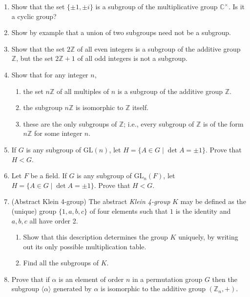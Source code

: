 \documentclass[11pt]{article}
\newenvironment{problems}
{
 \begin{enumerate}[topsep=1pt,itemsep=0pt,parsep=2pt,leftmargin=0.6cm,%
 label={\arabic*.}, ref=\arabic*] \small
}
{
 \end{enumerate}
}
\theoremstyle{definition}
\newcommand{\C}{\mathbb{C}} %
\newcommand{\Z}{\mathbb{Z}} %
\newcommand{\gen}[1]{\langle #1 \rangle}
\newcommand{\GL}{\mathrm{GL}}
\begin{document}
\begin{problems}

\item Show that the set $\{ \pm 1, \pm i\}$ is a subgroup of the
  multiplicative group $\C^\times$. Is it a cyclic group? 

\item Show by example that a union of two subgroups need not be a
  subgroup.

\item Show that the set $2\Z$ of all even integers is a subgroup of
  the additive group $\Z$, but the set $2\Z+1$ of all odd integers is
  not a subgroup.

\item Show that for any integer $n$, 
  \begin{enumerate}
  \item the set $n\Z$ of all multiples of $n$ is a subgroup of the
    additive group $\Z$.
  \item the subgroup $n\Z$ is isomorphic to $\Z$ itself. 
  \item these are the only subgroups of $\Z$; i.e., every subgroup of
    $\Z$ is of the form $n\Z$ for some integer $n$.
  \end{enumerate}

\item If $G$ is any subgroup of $\GL(n)$, let $H = \{ A \in G \mid
  \det A = \pm 1 \}$. Prove that $H < G$.
  
\item Let $F$ be a field. If $G$ is any subgroup of $\GL_n(F)$, let $H
  = \{ A \in G \mid \det A = \pm 1 \}$. Prove that $H < G$.

\item{} \label{prob:Klein-4-group} (Abstract
  Klein 4-group) The abstract \emph{Klein 4-group} $K$ may be defined
  as the (unique) group $\{1,a,b,c\}$ of four elements such that $1$
  is the identity and $a, b, c$ all have order 2.
  \begin{enumerate}
  \item Show that this description determines the group $K$ uniquely,
    by writing out its only possible multiplication table.
  \item Find all the subgroups of $K$.
  \end{enumerate}


\item Prove that if $\alpha$ is an element of order $n$ in a
  permutation group $G$ then the subgroup $\gen{\alpha}$ generated by
  $\alpha$ is isomorphic to the additive group $(\Z_n, +)$.




\end{problems}
\end{document}

